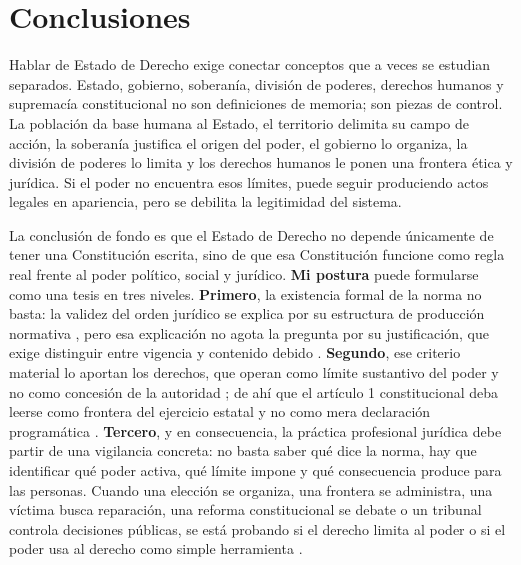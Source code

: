 \documentclass[
spanish,
letterpaper, oneside
]{article}
\begin{document}
	\section{Conclusiones}
	
	Hablar de Estado de Derecho exige conectar conceptos que a veces se estudian separados. Estado, gobierno, soberanía, división de poderes, derechos humanos y supremacía constitucional no son definiciones de memoria; son piezas de control. La población da base humana al Estado, el territorio delimita su campo de acción, la soberanía justifica el origen del poder, el gobierno lo organiza, la división de poderes lo limita y los derechos humanos le ponen una frontera ética y jurídica. Si el poder no encuentra esos límites, puede seguir produciendo actos legales en apariencia, pero se debilita la legitimidad del sistema.
	
	La conclusión de fondo es que el Estado de Derecho no depende únicamente de tener una Constitución escrita, sino de que esa Constitución funcione como regla real frente al poder político, social y jurídico. \textbf{Mi postura} puede formularse como una tesis en tres niveles. \textbf{Primero}, la existencia formal de la norma no basta: la validez del orden jurídico se explica por su estructura de producción normativa \citep{kelsen1982}, pero esa explicación no agota la pregunta por su justificación, que exige distinguir entre vigencia y contenido debido \citep{garcia2002}. \textbf{Segundo}, ese criterio material lo aportan los derechos, que operan como límite sustantivo del poder y no como concesión de la autoridad \citep{ansutegui2007}; de ahí que el artículo 1 constitucional deba leerse como frontera del ejercicio estatal y no como mera declaración programática \citep{cpeum2026}. \textbf{Tercero}, y en consecuencia, la práctica profesional jurídica debe partir de una vigilancia concreta: no basta saber qué dice la norma, hay que identificar qué poder activa, qué límite impone y qué consecuencia produce para las personas. Cuando una elección se organiza, una frontera se administra, una víctima busca reparación, una reforma constitucional se debate o un tribunal controla decisiones públicas, se está probando si el derecho limita al poder o si el poder usa al derecho como simple herramienta \citep{estudioCaso2026}.
	
\end{document}
